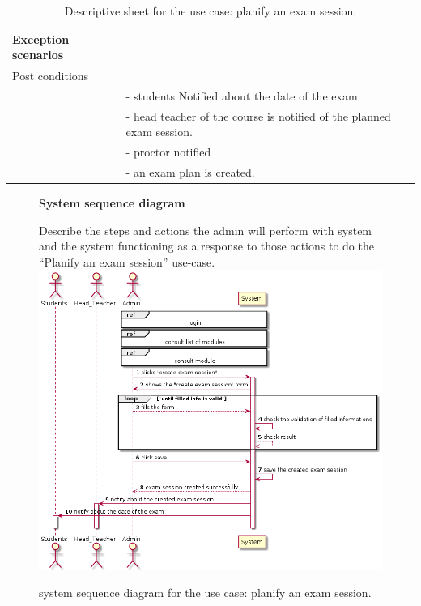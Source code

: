 \documentclass[]{uc2pfecaneva}
\begin{document}
\begin{table}[t]
\begin{tabularx}{\textwidth}{|l|X|}
            Exception scenarios   &                                                                                                                                                                   \\ \hline
            Post conditions       &                                                                                                                                                                   \\
            & - students Notified about the date of the exam.                                                                                                                   \\
            & - head teacher of the course is notified of the planned exam session.                                                                                             \\
            & - proctor notified                                                                                           \\
            & - an exam plan is created.                                                                                                                               \\ \hline
        \end{tabularx}
        \caption{Descriptive sheet for the use case: planify an exam session.}
        \label{table:2}
    \end{table}
    \clearpage


    \begin{figure}
        \raggedright\textbf{System sequence diagram}\linebreak
        \raggedright{Describe the steps and actions the admin will perform with system and the system functioning
        as a response to those actions to do the “Planify an exam session” use-case.}
        \includegraphics[width=\textwidth]{images/create_exam_session}

        \caption{system sequence diagram for the use case: planify an exam session.}
    \end{figure}
    \clearpage
\end{document}
